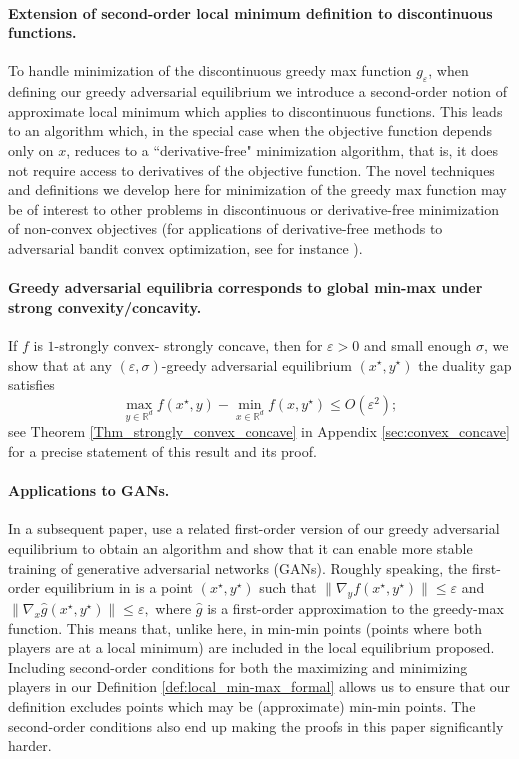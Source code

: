 \documentclass[11pt,letterpaper]{article}
\renewcommand{\epsilon}{\varepsilon}
\begin{document}
\paragraph{Extension of second-order local minimum definition to discontinuous functions.} 
%
 To handle minimization of the discontinuous greedy max function $g_\epsilon$, when defining our greedy adversarial equilibrium we introduce a second-order notion of approximate local minimum which applies to discontinuous functions. 
  This leads to an algorithm which, in the special case when the objective function depends only on $x$, reduces to a ``derivative-free" minimization algorithm, that is, it does not require access to derivatives of the objective function.
  The novel techniques and definitions we develop here for minimization of the greedy max function may be of interest to other problems in discontinuous or derivative-free minimization of non-convex objectives (for applications of derivative-free methods to adversarial bandit convex optimization, see for instance \cite{flaxman2005online}).

\vspace{-3mm}
\paragraph{Greedy adversarial equilibria corresponds to global min-max under strong convexity/concavity.}   If $f$ is $1$-strongly convex- strongly concave, then for  $\epsilon>0$ and small enough $\sigma$, we show that at any $(\epsilon, \sigma)$-greedy adversarial equilibrium $(x^\star, y^\star)$ the duality gap satisfies $$\max_{y \in \mathbb{R}^d} f(x^\star, y)-\min_{x \in \mathbb{R}^d} f(x, y^\star) \leq O(\epsilon^2);$$ see Theorem \ref{Thm_strongly_convex_concave} in Appendix \ref{sec:convex_concave} for a precise statement of this result and its proof.


\vspace{-3mm}
\paragraph{Applications to GANs.}  In a subsequent paper, \cite{OurAppliedPaper} use a  related first-order version of our greedy adversarial equilibrium to obtain an algorithm and show that it can enable more stable training of generative adversarial networks (GANs).
%
Roughly speaking, the first-order equilibrium in \cite{OurAppliedPaper} is a point $(x^\star,y^\star)$ such that 
$\|\nabla_y f(x^\star, y^\star)\| \leq \epsilon$ and $\|\nabla_x \hat{g}(x^\star, y^\star)\| \leq \epsilon,$
%
%
where $\hat{g}$ is a first-order approximation to the greedy-max function. 
% 
This means that, unlike here, in \cite{OurAppliedPaper} min-min points (points where both players are at a local minimum) are included in the local equilibrium proposed.
%
Including second-order conditions for both the maximizing and minimizing players in our Definition \ref{def:local_min-max_formal}  allows us to ensure that our definition excludes points which may be (approximate) min-min points.
The second-order conditions also end up making the proofs in this paper significantly harder.
\end{document}
